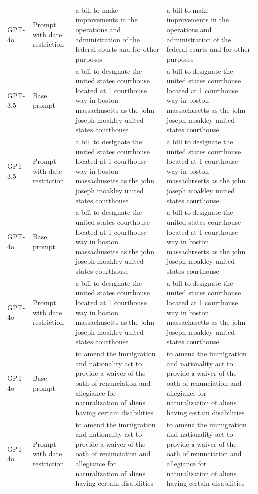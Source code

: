 \begin{longtable}{>{\raggedright\arraybackslash}p{1.4cm}>{\raggedright\arraybackslash}p{1.4cm}>{\raggedright\arraybackslash}p{5.5cm}>{\raggedright\arraybackslash}p{5.5cm}}
GPT-4o & Prompt with date restriction & a bill to make improvements in the operations and administration of the federal courts and for other purposes & a bill to make improvements in the operations and administration of the federal courts and for other purposes\\
GPT-3.5 & Base prompt & a bill to designate the united states courthouse located at 1 courthouse way in boston massachusetts as the john joseph moakley united states courthouse & a bill to designate the united states courthouse located at 1 courthouse way in boston massachusetts as the john joseph moakley united states courthouse\\
GPT-3.5 & Prompt with date restriction & a bill to designate the united states courthouse located at 1 courthouse way in boston massachusetts as the john joseph moakley united states courthouse & a bill to designate the united states courthouse located at 1 courthouse way in boston massachusetts as the john joseph moakley united states courthouse\\
GPT-4o & Base prompt & a bill to designate the united states courthouse located at 1 courthouse way in boston massachusetts as the john joseph moakley united states courthouse & a bill to designate the united states courthouse located at 1 courthouse way in boston massachusetts as the john joseph moakley united states courthouse\\
GPT-4o & Prompt with date restriction & a bill to designate the united states courthouse located at 1 courthouse way in boston massachusetts as the john joseph moakley united states courthouse & a bill to designate the united states courthouse located at 1 courthouse way in boston massachusetts as the john joseph moakley united states courthouse\\
GPT-4o & Base prompt & to amend the immigration and nationality act to provide a waiver of the oath of renunciation and allegiance for naturalization of aliens having certain disabilities & to amend the immigration and nationality act to provide a waiver of the oath of renunciation and allegiance for naturalization of aliens having certain disabilities\\
GPT-4o & Prompt with date restriction & to amend the immigration and nationality act to provide a waiver of the oath of renunciation and allegiance for naturalization of aliens having certain disabilities & to amend the immigration and nationality act to provide a waiver of the oath of renunciation and allegiance for naturalization of aliens having certain disabilities\\

\end{longtable}
